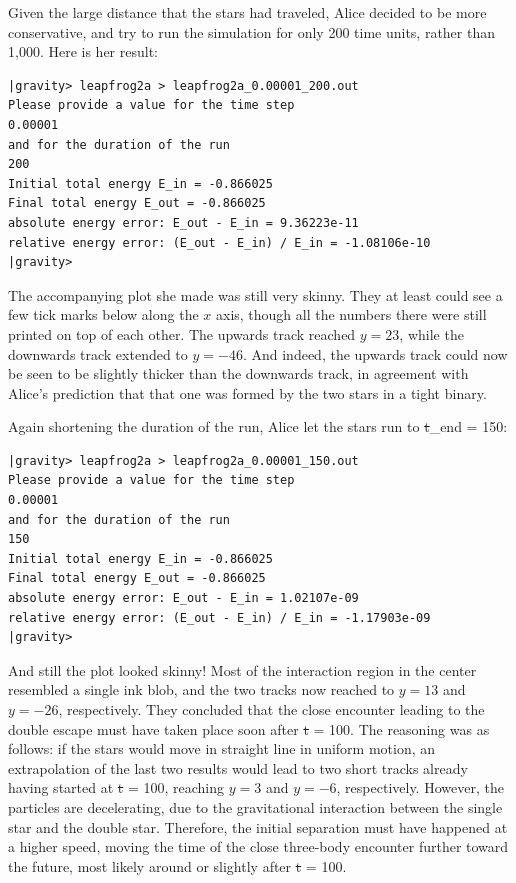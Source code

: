 Given the large distance that the stars had traveled, Alice decided to
be more conservative, and try to run the simulation for only 200 time
units, rather than 1,000.  Here is her result:

\begin{small}
\begin{verbatim}
|gravity> leapfrog2a > leapfrog2a_0.00001_200.out
Please provide a value for the time step
0.00001
and for the duration of the run
200
Initial total energy E_in = -0.866025
Final total energy E_out = -0.866025
absolute energy error: E_out - E_in = 9.36223e-11
relative energy error: (E_out - E_in) / E_in = -1.08106e-10
|gravity>
\end{verbatim}
\end{small}

The accompanying plot she made was still very skinny.  They at least
could see a few tick marks below along the $x$ axis, though all the
numbers there were still printed on top of each other.  The upwards
track reached $y=23$, while the downwards track extended to $y=-46$.
And indeed, the upwards track could now be seen to be slightly thicker
than the downwards track, in agreement with Alice's prediction that
that one was formed by the two stars in a tight binary.

Again shortening the duration of the run, Alice let the stars run to
{\st t\_end = 150}:

\begin{small}
\begin{verbatim}
|gravity> leapfrog2a > leapfrog2a_0.00001_150.out
Please provide a value for the time step
0.00001
and for the duration of the run
150
Initial total energy E_in = -0.866025
Final total energy E_out = -0.866025
absolute energy error: E_out - E_in = 1.02107e-09
relative energy error: (E_out - E_in) / E_in = -1.17903e-09
|gravity>
\end{verbatim}
\end{small}

And still the plot looked skinny!  Most of the interaction region in
the center resembled a single ink blob, and the two tracks now reached
to $y=13$ and $y=-26$, respectively.  They concluded that the close
encounter leading to the double escape must have taken place soon
after {\st t = 100}.  The reasoning was as follows: if the stars would
move in straight line in uniform motion, an extrapolation of the last
two results would lead to two short tracks already having started at 
{\st t = 100}, reaching $y=3$ and $y=-6$, respectively.  However, the
particles are decelerating, due to the gravitational interaction
between the single star and the double star.  Therefore, the initial
separation must have happened at a higher speed, moving the time of
the close three-body encounter further toward the future, most likely
around or slightly after {\st t = 100}.

